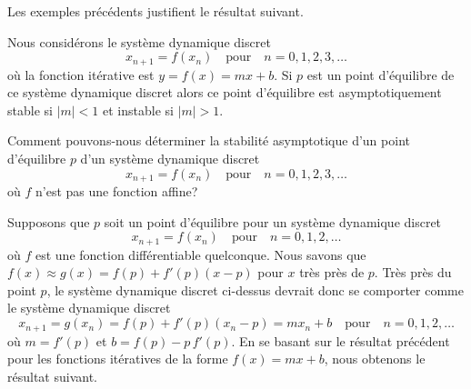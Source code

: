 {%




Les exemples précédents justifient le résultat suivant.

\begin{prop}
Nous considérons le système dynamique discret
\[
x_{n+1} = f(x_n) \quad \text{pour} \quad n=0, 1, 2, 3, \ldots
\]
où la fonction itérative est $y=f(x) = m x +b$.  Si $p$ est un point
d'équilibre de ce système dynamique discret alors ce point d'équilibre
est asymptotiquement stable si $|m|<1$ et instable si $|m|>1$.
\end{prop}

Comment pouvons-nous déterminer la stabilité asymptotique d'un point
d'équilibre $p$ d'un système dynamique discret
\[
x_{n+1} = f(x_n) \quad \text{pour} \quad n=0, 1, 2, 3, \ldots
\]
où $f$ n'est pas une fonction affine?

Supposons que $p$ soit un point d'équilibre pour un système dynamique
discret
\[
x_{n+1} = f(x_n) \quad \text{pour} \quad n =0, 1, 2 ,\ldots
\]
où $f$ est une fonction différentiable quelconque.  Nous savons que
$f(x) \approx g(x) = f(p) + f'(p) (x-p)$ pour $x$ très près de $p$.
Très près du point $p$, le système dynamique discret ci-dessus devrait
donc se comporter comme le système dynamique discret
\[
x_{n+1} = g(x_n) = f(p) + f'(p) (x_n-p) = m x_n + b \quad \text{pour} \quad
n=0,1,2,\ldots
\]
où $m = f'(p)$ et $b = f(p) - p\,f'(p)$.  En se basant sur le résultat
précédent pour les fonctions itératives de la forme $f(x) = mx+b$,
nous obtenons le résultat suivant.

}
